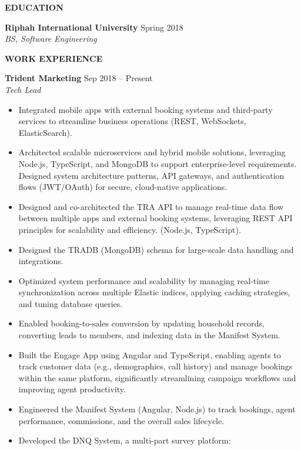 \documentclass{res} %
\newcommand{\Section}[1]{%
  \vspace{8pt}%
  \begin{center}
    {\bfseries #1}
  \end{center}
  \vspace{2pt}%
}
\begin{document}
\begin{resume}


\Section{EDUCATION}
  \textbf{Riphah International University} \hfill Spring 2018\\
  {\sl BS, Software Engineering}

\Section{WORK EXPERIENCE}


  \textbf{Trident Marketing} \hfill Sep 2018 -- Present\\
  {\sl Tech Lead}
  \begin{itemize}
    \item Integrated mobile apps with external booking systems and third-party services to streamline business operations (REST, WebSockets, ElasticSearch).
    \item Architected scalable microservices and hybrid mobile solutions, leveraging Node.js, TypeScript, and MongoDB to support enterprise-level requirements. Designed system architecture patterns, API gateways, and authentication flows (JWT/OAuth) for secure, cloud-native applications.
    \item Designed and co-architected the TRA API to manage real-time data flow between multiple apps and external booking systems, leveraging REST API principles for scalability and efficiency. (Node.js, TypeScript).
    \item Designed the TRADB (MongoDB) schema for large-scale data handling and integrations.
    \item Optimized system performance and scalability by managing real-time synchronization across multiple Elastic indices, applying caching strategies, and tuning database queries.
    \item Enabled booking-to-sales conversion by updating household records, converting leads to members, and indexing data in the Manifest System.
    \item Built the Engage App using Angular and TypeScript, enabling agents to track customer data (e.g., demographics, call history) and manage bookings within the same platform, significantly streamlining campaign workflows and improving agent productivity. 
    \item Engineered the Manifest System (Angular, Node.js) to track bookings, agent performance, commissions, and the overall sales lifecycle.
    \item Developed the DNQ System, a multi-part survey platform:

\end{itemize}
\end{resume}
\end{document}
